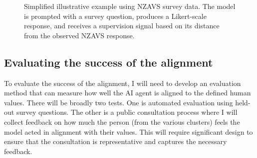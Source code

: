 \begin{figure}[h]
\centering
{}
\caption{Simplified illustrative example using NZAVS survey data. The model is prompted with a survey question, produces a Likert-scale response, and receives a supervision signal based on its distance from the observed NZAVS response.}
\label{fig:nzavs-simple-sft}

\end{figure}

\subsection{Evaluating the success of the alignment}

To evaluate the success of the alignment, I will need to develop an evaluation method that can measure how well the AI agent is aligned to the defined human values. There will be broadly two tests. One is automated evaluation using held-out survey questions. The other is a public consultation process where I will collect feedback on how much the person (from the various clusters) feels the model acted in alignment with their values. This will require significant design to ensure that the consultation is representative and captures the necessary feedback.

